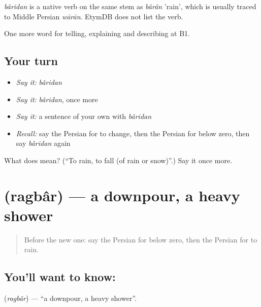 \begin{cousinweb}
\emph{bâridan} is a native verb on the same stem as \emph{bârân} 'rain', which is usually traced to Middle Persian \emph{wārān}. EtymDB does not list the verb.
\end{cousinweb}

\begin{grammarlens}[title={What you've built}]
One more word for telling, explaining and describing at B1.
\end{grammarlens}

\subsection*{Your turn}
\begin{itemize}
\raggedright
  \item \emph{Say it:} \emph{bâridan}
  \item \emph{Say it:} \emph{bâridan}, once more
  \item \emph{Say it:} a sentence of your own with \emph{bâridan}
  \item \emph{Recall:} say the Persian for to change, then the Persian for below zero, then say \emph{bâridan} again
\end{itemize}

\begin{tcolorbox}[breakable,colback=teal!4,colframe=teal!35!black,title={Before you move on}]
What does  mean? (\textquotedblleft{}To rain, to fall (of rain or snow)\textquotedblright{}.) Say it once more.
\end{tcolorbox}
\section[\texorpdfstring{\fa{رگبار} (ragbâr)}{رگبار (ragbâr)}]{ (ragbâr) — a downpour, a heavy shower}

\label{lesson:FA-C474-ragbar}



\begin{quote}
Before the new one: say the Persian for below zero, then the Persian for to rain.
\end{quote}

\subsection*{You'll want to know: }
\textbf{} (\emph{ragbâr}) — \textquotedblleft{}a downpour, a heavy shower\textquotedblright{}.

